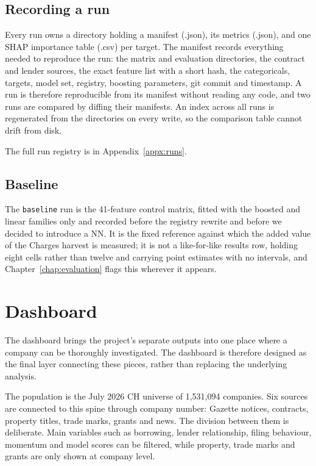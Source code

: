 \documentclass[    author={Samuel Menon Demelo; Sneha Saphala Ram Prasad; 
Viktor Ander Lindholm; Vishal Khatri},
               supervisor={Prof. Fernando Moreno-Pino},
                   degree={MSc},
                    title={Lloyds Commercial Banking Intelligence},
                 subtitle={Ranking SME Lending, Risk and Growth Prospects for Lloyds Banking Group},
                     type={},
                     year={2026}]{dissertation}
\begin{document}
\subsection{Recording a run}
Every run owns a directory holding a manifest (.json), its metrics (.json), and one SHAP importance table (.csv) per target. The manifest records everything needed to reproduce the run: the matrix and evaluation directories, the contract and lender sources, the exact feature list with a short hash, the categoricals, targets, model set, registry, boosting parameters, git commit and timestamp. A run is therefore reproducible from its manifest without reading any code, and two runs are compared by diffing their manifests. An index across all runs is regenerated from the directories on every write, so the comparison table cannot drift from disk.

The full run registry is in Appendix~\ref{appx:runs}.

\subsection{Baseline}
The \texttt{baseline} run is the 41-feature control matrix, fitted with the boosted and linear families only and recorded before the registry rewrite and before we decided to introduce a NN. It is the fixed reference against which the added value of the Charges harvest is measured; it is not a like-for-like results row, holding eight cells rather than twelve and carrying point estimates with no intervals, and Chapter~\ref{chap:evaluation} flags this wherever it appears.

\section{Dashboard}
\label{sec:delivery}
The dashboard brings the project's separate outputs into one place where a company can be thoroughly investigated. The dashboard is therefore designed as the final layer connecting these pieces, rather than replacing the underlying analysis.

The population is the July 2026 CH universe of 1,531,094 companies. Six sources are connected to this spine through company number: Gazette notices, contracts, property titles, trade marks, grants and news. The division between them is deliberate. Main variables such as borrowing, lender relationship, filing behaviour, momentum and model scores can be filtered, while property, trade marks and grants are only shown at company level.
\end{document}
